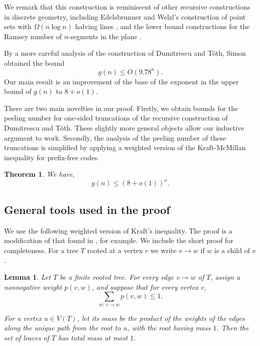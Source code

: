 \documentclass[11pt]{amsart}
\newtheorem{theorem}{Theorem}[section]
\newtheorem{lemma}[lemma]{Lemma}
\theoremstyle{definition}
\begin{document}
We remark that this construction is reminiscent of other recursive 
constructions in discrete geometry, including 
Edelsbrunner and Welzl's construction of point sets with $\Omega(n\log n)$ 
halving lines \cite{edelsbrunner1985number}, and the lower bound constructions for the Ramsey number 
of $n$-segments in the plane
\cite{LarMatPachToro, KaroPachToth97, kyncl2012ramsey}.  
\par 
By a more careful 
analysis of the construction 
of Dumitrescu and T\'oth, Simon \cite{simon2026further} obtained the bound 
\begin{equation*}
    g(n) \leq O(9.78^n).
\end{equation*}
Our main result is an improvement of 
the base of the exponent in the upper bound 
of $g(n)$ to $8+o(1)$. 
\par
There are two main novelties in our proof. 
Firstly, we  
obtain bounds for 
the peeling number for one-sided 
truncations of 
the recursive construction of 
Dumitrescu and T\'oth. These slightly more general objects allow our inductive argument to work.  
Secondly, 
the analysis of the peeling number of these 
truncations is simplified 
by applying a weighted version of 
the Kraft-McMillan inequality 
\cite{kraft1949device,mcmillan1956two} 
for prefix-free codes. 

\begin{theorem}\label{thm:main}
We have, 
\begin{equation*}
   g(n)\le(8+o(1))^n.
\end{equation*}
\end{theorem}

\subsection{General tools used in the proof}
We use the following weighted version of Kraft's inequality. The proof is a modification of 
that found in \cite{cover1991elements}, for example. We include the short proof for completeness.
For a tree $T$ rooted at a vertex $r$ we write 
$v \to w$ if $w$ is a child of $v$. 
\begin{lemma}\label{lem:weighted-kraft}
Let $T$ be a finite rooted tree. 
For every edge $v\to w$ of $T$, assign a
nonnegative weight $p(v,w)$, and suppose that for every vertex $v$,
\begin{equation*}
    \sum_{w:\, v\to w} p(v,w)\le 1.
\end{equation*}

For a vertex $u\in V(T)$, let its mass be the product of the weights
of the edges along the unique path from the root to $u$, with the root
having mass $1$. Then the set of leaves of $T$ has total mass at most $1$.
\end{lemma}
\end{document}
